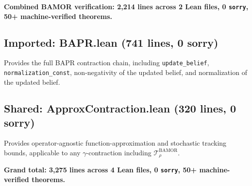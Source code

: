 \medskip
\noindent\textbf{Combined BAMOR verification: 2,214 lines across 2 Lean files, 0 \texttt{sorry}, 50+ machine-verified theorems.}

\subsection{Imported: BAPR.lean (741 lines, 0 sorry)}
Provides the full BAPR contraction chain, including \texttt{update\_belief}, \texttt{normalization\_const}, non-negativity of the updated belief, and normalization of the updated belief.

\subsection{Shared: ApproxContraction.lean (320 lines, 0 sorry)}
Provides operator-agnostic function-approximation and stochastic tracking bounds, applicable to any $\gamma$-contraction including $\mathcal{T}^{\mathrm{BAMOR}}_\rho$.

\medskip
\noindent\textbf{Grand total: 3,275 lines across 4 Lean files, 0 \texttt{sorry}, 50+ machine-verified theorems.}
